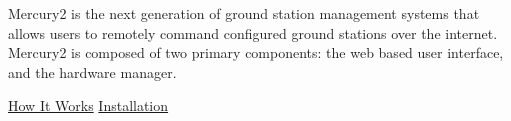 Mercury2 is the next generation of ground station management systems that allows users to remotely command configured ground stations over the internet. Mercury2 is composed of two primary components\-: the web based user interface, and the hardware manager.

\hyperlink{how_it_works}{How It Works} \hyperlink{installation}{Installation} 